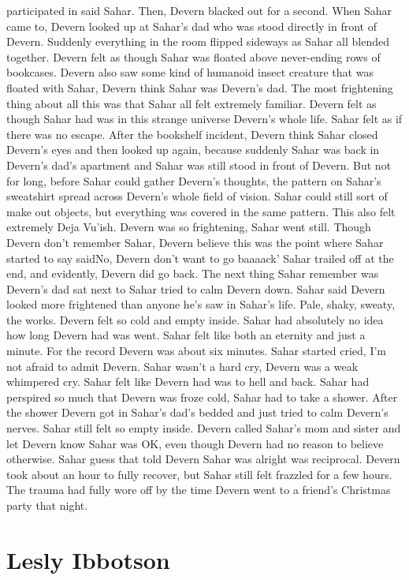 \documentclass[12pt]{book}
\begin{document}
participated in said Sahar. Then, Devern blacked out for a second. When Sahar came to, Devern looked up at Sahar's dad who was stood directly in front of Devern. Suddenly everything in the room flipped sideways as Sahar all blended together. Devern felt as though Sahar was floated above never-ending rows of bookcases. Devern also saw some kind of humanoid insect creature that was floated with Sahar, Devern think Sahar was Devern's dad. The most frightening thing about all this was that Sahar all felt extremely familiar. Devern felt as though Sahar had was in this strange universe Devern's whole life. Sahar felt as if there was no escape. After the bookshelf incident, Devern think Sahar closed Devern's eyes and then looked up again, because suddenly Sahar was back in Devern's dad's apartment and Sahar was still stood in front of Devern. But not for long, before Sahar could gather Devern's thoughts, the pattern on Sahar's sweatshirt spread across Devern's whole field of vision. Sahar could still sort of make out objects, but everything was covered in the same pattern. This also felt extremely Deja Vu'ish. Devern was so frightening, Sahar went still. Though Devern don't remember Sahar, Devern believe this was the point where Sahar started to say saidNo, Devern don't want to go baaaack' Sahar trailed off at the end, and evidently, Devern did go back. The next thing Sahar remember was Devern's dad sat next to Sahar tried to calm Devern down. Sahar said Devern looked more frightened than anyone he's saw in Sahar's life. Pale, shaky, sweaty, the works. Devern felt so cold and empty inside. Sahar had absolutely no idea how long Devern had was went. Sahar felt like both an eternity and just a minute. For the record Devern was about six minutes. Sahar started cried, I'm not afraid to admit Devern. Sahar wasn't a hard cry, Devern was a weak whimpered cry. Sahar felt like Devern had was to hell and back. Sahar had perspired so much that Devern was froze cold, Sahar had to take a shower. After the shower Devern got in Sahar's dad's bedded and just tried to calm Devern's nerves. Sahar still felt so empty inside. Devern called Sahar's mom and sister and let Devern know Sahar was OK, even though Devern had no reason to believe otherwise. Sahar guess that told Devern Sahar was alright was reciprocal. Devern took about an hour to fully recover, but Sahar still felt frazzled for a few hours. The trauma had fully wore off by the time Devern went to a friend's Christmas party that night.



\chapter{Lesly Ibbotson}
\end{document}
